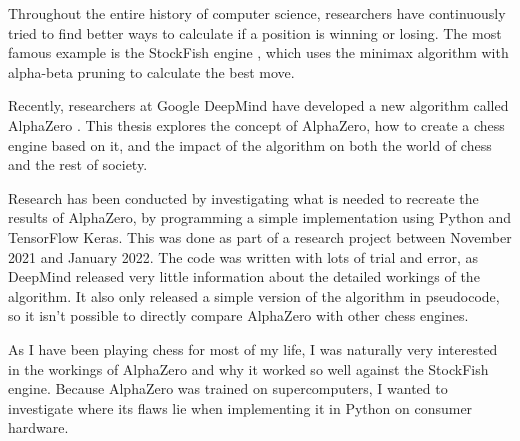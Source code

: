 \documentclass{article}
\begin{document}
Throughout the entire history of computer science, researchers have continuously tried to find better
ways to calculate if a position is winning or losing. The most famous example is the StockFish 
engine \cite{StockfishChess2022}, which uses the minimax algorithm with alpha-beta pruning to calculate the best move.

Recently, researchers at Google DeepMind have developed a new algorithm called AlphaZero \cite{AlphaZero2022}.
This thesis explores the concept of AlphaZero, how to create a chess engine based on it, and the impact of 
the algorithm on both the world of chess and the rest of society.

Research has been conducted by investigating what is needed to recreate the results of AlphaZero, 
by programming a simple implementation using Python and TensorFlow Keras. This was done as part of a research project
between November 2021 and January 2022. The code was written with lots of trial and error, as DeepMind released 
very little information about the detailed workings of the algorithm. It also only released a simple version of 
the algorithm in pseudocode, so it isn't possible to directly compare AlphaZero with other chess engines.

As I have been playing chess for most of my life, I was naturally very interested in the workings of AlphaZero
and why it worked so well against the StockFish engine. Because AlphaZero was trained on supercomputers, 
I wanted to investigate where its flaws lie when implementing it in Python on consumer hardware.


\end{document}
